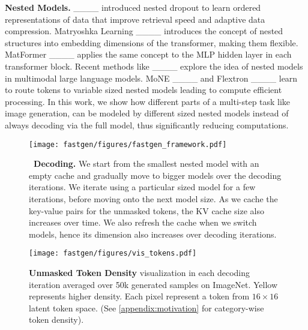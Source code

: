 {\flushleft \textbf{Nested Models.}} ____ introduced nested dropout to learn ordered representations of data that improve retrieval speed and adaptive data compression. Matryoshka Learning ____ introduces the concept of nested structures into embedding dimensions of the transformer, making them flexible. MatFormer ____ applies
the same concept to the MLP hidden layer in each transformer block. Recent methods like ____ explore the idea of nested models in multimodal large language models. MoNE ____ and Flextron ____ learn to route tokens to variable sized nested models  leading to compute efficient processing. In this work, we show how different parts of a multi-step task like image generation, can be modeled by different sized nested models instead of always decoding via the full model, thus significantly reducing computations.






\begin{figure*}[t]
    \centering
    \texttt{[image: fastgen/figures/fastgen\_framework.pdf]}
    \caption{\small \textbf{\ours \ Decoding.} We start from the smallest nested model with an empty cache and gradually move to bigger models over the decoding iterations. We iterate using a particular sized model for a few iterations, before moving onto the next model size. As we cache the key-value pairs for the unmasked tokens, the KV cache size also increases over time. We also refresh the cache when we switch models, hence its dimension also increases over decoding iterations.}
    \label{fig:main_algo}
\end{figure*}

\begin{figure*}[h]
    \centering
    \texttt{[image: fastgen/figures/vis\_tokens.pdf]}
    \caption{\small \textbf{Unmasked Token Density} visualization in each decoding iteration averaged over 50k generated samples on ImageNet. Yellow represents higher density. Each pixel represent a token from $16 \times 16$ latent token space. (See \cref{appendix:motivation} for category-wise token density).}
    \label{fig:vis_tokens}
\end{figure*}